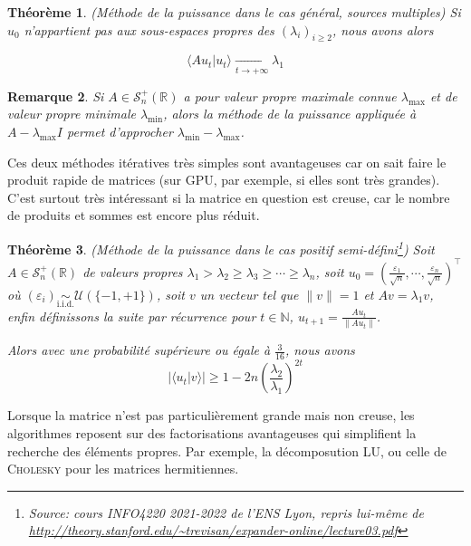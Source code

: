 \documentclass[svgnames,dvipsnames,a4paper,10pt,french]{report}
\newtheorem{theorem}{Théorème}[section]
\newtheorem{remark}[theorem]{Remarque}
\begin{document}
\begin{appendices}
\begin{theorem}{(Méthode de la puissance dans le cas général, sources multiples)}
Si $u_0$ n'appartient pas aux sous-espaces propres des $(\lambda_i)_{i\ge 2}$, nous avons alors

\begin{equation}
    \langle Au_t | u_t \rangle \xrightarrow[t \rightarrow +\infty]{} \lambda_1
\end{equation}
\end{theorem}

\begin{remark}
Si $A\in \mathscr{S}_n^{+}(\mathbb{R})$ a pour valeur propre maximale connue $\lambda_{\text{max}}$ et de valeur propre minimale $\lambda_{\text{min}}$, alors la méthode de la puissance appliquée à $A-\lambda_{\text{max}}I$ permet d'approcher $\lambda_{\text{min}}-\lambda_{\text{max}}$.
\end{remark}





 Ces deux méthodes itératives très simples sont avantageuses car on sait faire le produit rapide de matrices (sur GPU, par exemple, si elles sont très grandes). C'est surtout très intéressant si la matrice en question est creuse, car le nombre de produits et sommes est encore plus réduit.

\begin{theorem}{(Méthode de la puissance dans le cas positif semi-défini\footnote{Source: cours INFO4220 2021-2022 de l'ENS Lyon, repris lui-même de \url{http://theory.stanford.edu/~trevisan/expander-online/lecture03.pdf}})}
Soit $A\in \mathscr{S}_n^{+}(\mathbb{R})$ de valeurs propres $\lambda_1 > \lambda_2 \ge \lambda_3 \ge \cdots \ge \lambda_n$, soit $u_0 = (\frac{\varepsilon_1}{\sqrt{n}}, \cdots, \frac{\varepsilon_n}{\sqrt{n}})^\top$ où $(\varepsilon_i) \underset{\text{i.i.d.}}{\sim} \mathcal{U}(\{-1,+1\})$, soit $v$ un vecteur tel que $\|v\|=1$ et $Av = \lambda_1 v$, enfin définissons la suite par récurrence pour $t\in\mathbb{N}$,  $u_{t+1} = \frac{Au_t}{\|Au_t\|}$.

Alors avec une probabilité supérieure ou égale à $\frac{3}{16}$, nous avons
\begin{equation}
    |\langle u_t|v\rangle | \ge 1 - 2n\left(\frac{\lambda_2}{\lambda_1}\right)^{2t}
\end{equation}
\end{theorem}


Lorsque la matrice n'est pas particulièrement grande mais non creuse, les algorithmes reposent sur des factorisations avantageuses qui simplifient la recherche des éléments propres. Par exemple, la décomposution LU, ou celle de \textsc{Cholesky} pour les matrices hermitiennes.





\end{appendices}
\end{document}
